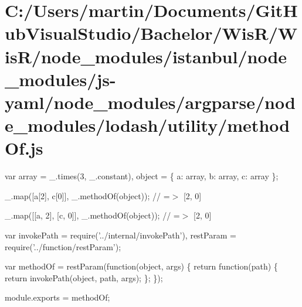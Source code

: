 \hypertarget{_c_1_2_users_2martin_2_documents_2_git_hub_visual_studio_2_bachelor_2_wis_r_2_wis_r_2node_module7181d123296b6eb010fb35b382e1d1ee}{}\section{C\+:/\+Users/martin/\+Documents/\+Git\+Hub\+Visual\+Studio/\+Bachelor/\+Wis\+R/\+Wis\+R/node\+\_\+modules/istanbul/node\+\_\+modules/js-\/yaml/node\+\_\+modules/argparse/node\+\_\+modules/lodash/utility/method\+Of.\+js}
var array = \+\_\+.\+times(3, \+\_\+.\+constant), object = \{ \textquotesingle{}a\textquotesingle{}\+: array, \textquotesingle{}b\textquotesingle{}\+: array, \textquotesingle{}c\textquotesingle{}\+: array \};

\+\_\+.\+map(\mbox{[}\textquotesingle{}a\mbox{[}2\mbox{]}\textquotesingle{}, \textquotesingle{}c\mbox{[}0\mbox{]}\textquotesingle{}\mbox{]}, \+\_\+.\+method\+Of(object)); // =$>$ \mbox{[}2, 0\mbox{]}

\+\_\+.\+map(\mbox{[}\mbox{[}\textquotesingle{}a\textquotesingle{}, \textquotesingle{}2\textquotesingle{}\mbox{]}, \mbox{[}\textquotesingle{}c\textquotesingle{}, \textquotesingle{}0\textquotesingle{}\mbox{]}\mbox{]}, \+\_\+.\+method\+Of(object)); // =$>$ \mbox{[}2, 0\mbox{]}


\begin{DoxyCodeInclude}
var invokePath = require(\textcolor{stringliteral}{'../internal/invokePath'}),
    restParam = require(\textcolor{stringliteral}{'../function/restParam'});

var methodOf = restParam(\textcolor{keyword}{function}(\textcolor{keywordtype}{object}, args) \{
  \textcolor{keywordflow}{return} \textcolor{keyword}{function}(path) \{
    \textcolor{keywordflow}{return} invokePath(\textcolor{keywordtype}{object}, path, args);
  \};
\});

module.exports = methodOf;
\end{DoxyCodeInclude}
 
